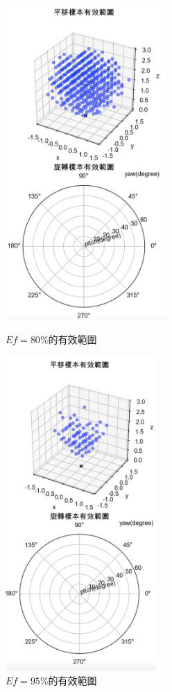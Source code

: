 \begin{figure}[htpb]
    \centering
    \begin{minipage}{.5\textwidth}
        \centering
        \includegraphics[height = 12cm]{ch4pic/ef80.png}
        \caption{$Ef=80\%$的有效範圍}
        \label{pic:ef80}
    \end{minipage}%
    \begin{minipage}{0.5\textwidth}
        \centering
        \includegraphics[height = 12cm]{ch4pic/ef95.png}
        \caption{$Ef=95\%$的有效範圍}
        \label{pic:ef95}
    \end{minipage}
\end{figure}



